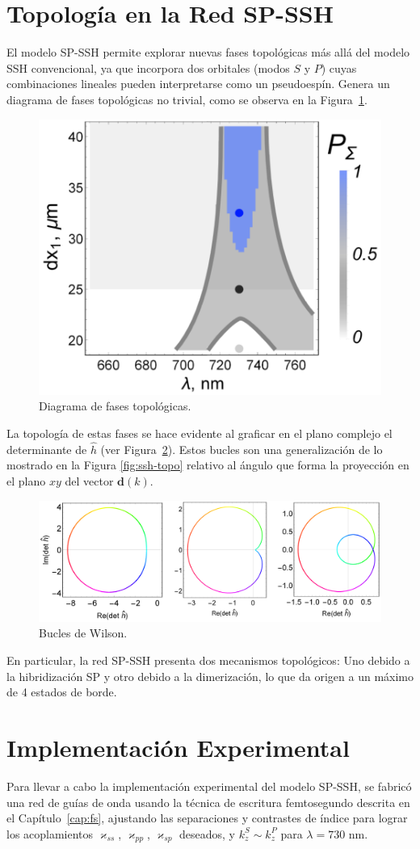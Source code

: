 \section{Topología en la Red SP-SSH}
El modelo SP-SSH permite explorar nuevas fases topológicas más allá del modelo SSH convencional, ya que incorpora dos orbitales (modos $S$ y $P$) cuyas combinaciones lineales pueden interpretarse como un pseudoespín. Genera un diagrama de fases topológicas no trivial, como se observa en la Figura~\ref{fig:sp-ssh-phase-diagram}.

\begin{figure}[H]
	\centering
	\includegraphics[width=0.5\linewidth]{media/sp-ssh-phase-diagram.png }
	\caption{Diagrama de fases topológicas. \label{fig:sp-ssh-phase-diagram}}
\end{figure}

La topología de estas fases se hace evidente al graficar en el plano complejo el determinante de $\hat{h}$  (ver Figura~\ref{fig:sp-wilson}). Estos bucles son una generalización de lo mostrado en la Figura \ref{fig:ssh-topo} relativo al ángulo que forma la proyección en el plano $xy$ del vector $\textbf{d}(k)$.

\begin{figure}[H]
	\centering
	\includegraphics[width=0.7\linewidth]{media/ssh-sp-winding-number.png }
	\caption{Bucles de Wilson. \label{fig:sp-wilson}}
\end{figure}

En particular, la red SP-SSH presenta dos mecanismos topológicos: Uno debido a la hibridización SP y otro debido a la dimerización, lo que da origen a un máximo de 4 estados de borde.

\section{Implementación Experimental}

Para llevar a cabo la implementación experimental del modelo SP-SSH, se fabricó una red de guías de onda usando la técnica de escritura femtosegundo descrita en el Capítulo~\ref{cap:fs}, ajustando las separaciones y contrastes de índice para lograr los acoplamientos $\varkappa_{ss}$, $\varkappa_{pp}$, $\varkappa_{sp}$ deseados, y $k_z^S \sim k_z^P$ para $\lambda=730$ nm.
